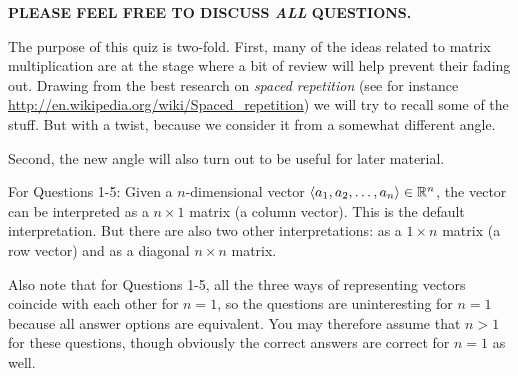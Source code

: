 \documentclass[10pt]{amsart}
\begin{document}
{\bf PLEASE FEEL FREE TO DISCUSS {\em ALL} QUESTIONS.}

The purpose of this quiz is two-fold. First, many of the ideas related
to matrix multiplication are at the stage where a bit of review will
help prevent their fading out. Drawing from the best research on {\em
  spaced repetition} (see for instance
\url{http://en.wikipedia.org/wiki/Spaced_repetition}) we will try to
recall some of the stuff. But with a twist, because we consider it
from a somewhat different angle.

Second, the new angle will also turn out to be useful for later
material.

For Questions 1-5: Given a $n$-dimensional vector $\langle
a_1,a_2,\dots,a_n \rangle \in \mathbb{R}^n$, the vector can be interpreted as
a $n \times 1$ matrix (a column vector). This is the default
interpretation. But there are also two other interpretations: as a $1
\times n$ matrix (a row vector) and as a diagonal $n \times n$ matrix.

Also note that for Questions 1-5, all the three ways of representing
vectors coincide with each other for $n = 1$, so the questions are
uninteresting for $n = 1$ because all answer options are
equivalent. You may therefore assume that $n > 1$ for these questions,
though obviously the correct answers are correct for $n = 1$ as well.
\end{document}
